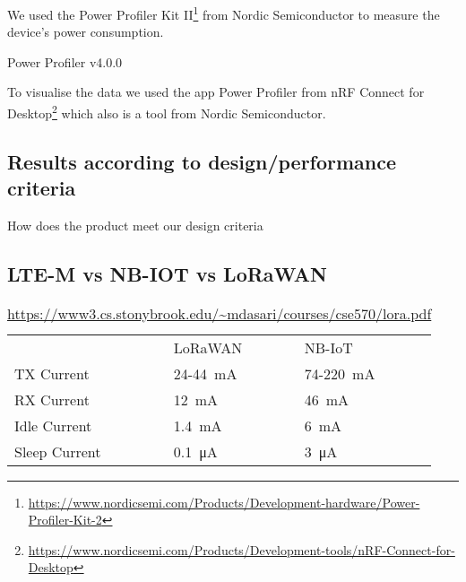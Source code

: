 We used the Power Profiler Kit II\footnote{\url{https://www.nordicsemi.com/Products/Development-hardware/Power-Profiler-Kit-2}} from Nordic Semiconductor to measure the device's power consumption.

Power Profiler v4.0.0

To visualise the data we used the app Power Profiler from nRF Connect for Desktop\footnote{\url{https://www.nordicsemi.com/Products/Development-tools/nRF-Connect-for-Desktop}} which also is a tool from Nordic Semiconductor.

\subsection{Results according to design/performance criteria}
How does the product meet our design criteria

\subsection{LTE-M vs NB-IOT vs LoRaWAN}

\begin{table}[H]
\centering
\caption{\url{https://www3.cs.stonybrook.edu/~mdasari/courses/cse570/lora.pdf}}
\begin{tabular}{lll}
              & LoRaWAN    & NB-IoT    \\
TX Current    & 24-\SI{44}{\milli\ampere} & 74-\SI{220}{\milli\ampere} \\
RX Current    & \SI{12}{\milli\ampere}     & \SI{46}{\milli\ampere}     \\
Idle Current  & \SI{1.4}{\milli\ampere}     & \SI{6}{\milli\ampere}      \\
Sleep Current & \SI{0.1}{\micro\ampere} & \SI{3}{\micro\ampere}
\end{tabular}
\end{table}

